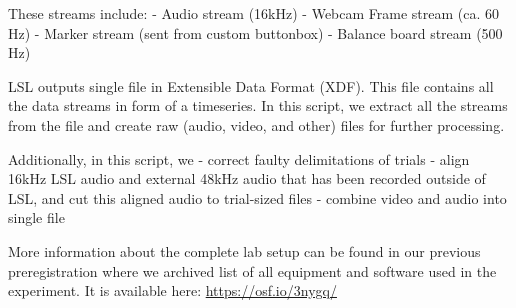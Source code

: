 \documentclass[
  letterpaper,
  DIV=11,
  numbers=noendperiod]{scrreprt}
\begin{document}
These streams include: - Audio stream (16kHz) - Webcam Frame stream (ca.
60 Hz) - Marker stream (sent from custom buttonbox) - Balance board
stream (500 Hz)

LSL outputs single file in Extensible Data Format (XDF). This file
contains all the data streams in form of a timeseries. In this script,
we extract all the streams from the file and create raw (audio, video,
and other) files for further processing.

Additionally, in this script, we - correct faulty delimitations of
trials - align 16kHz LSL audio and external 48kHz audio that has been
recorded outside of LSL, and cut this aligned audio to trial-sized files
- combine video and audio into single file

More information about the complete lab setup can be found in our
previous preregistration where we archived list of all equipment and
software used in the experiment. It is available here:
\url{https://osf.io/3nygq/}
\end{document}

